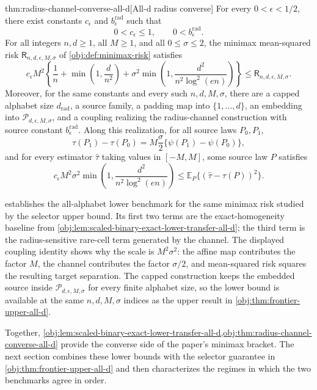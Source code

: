 \begin{theoremv}{thm:radius-channel-converse-all-d}[All-d radius converse]
For every \(0<\epsilon<1/2\), there exist constants \(c_{\epsilon}\) and \(b_{\epsilon}^{\mathrm{rad}}\) such that
\[
0<c_{\epsilon}\le 1,
\qquad
0<b_{\epsilon}^{\mathrm{rad}}.
\]
For all integers \(n,d\ge 1\), all \(M\ge 1\), and all \(0\le \sigma\le 2\), the minimax mean-squared risk \(\mathsf R_{n,d,\epsilon,M,\sigma}\) of \cref{obj:def:minimax-risk} satisfies
\[
c_{\epsilon}M^2
\left\{
\frac1n+\min\left(1,\frac d{n^2}\right)
+\sigma^2\min\left(1,\frac{d^2}{n^2\log^2(en)}\right)
\right\}
\le
\mathsf R_{n,d,\epsilon,M,\sigma}.
\]
Moreover, for the same constants and every such \(n,d,M,\sigma\), there are a capped alphabet size \(d_{\mathrm{rad}}\), a source family, a padding map into \(\{1,\ldots,d\}\), an embedding into \(\mathcal P_{d,\epsilon,M,\sigma}\), and a coupling realizing the radius-channel construction with source constant \(b_{\epsilon}^{\mathrm{rad}}\). Along this realization, for all source laws \(P_0,P_1\),
\[
\tau(P_1)-\tau(P_0)
=
M\frac{\sigma}{2}
\{\psi(P_1)-\psi(P_0)\},
\]
and for every estimator \(\widehat\tau\) taking values in \([-M,M]\), some source law \(P\) satisfies
\[
c_{\epsilon}M^2\sigma^2
\min\left(1,\frac{d^2}{n^2\log^2(en)}\right)
\le
\mathbb E_P\{(\widehat\tau-\tau(P))^2\}.
\]
\end{theoremv}

 establishes the all-alphabet lower benchmark for the same minimax risk studied by the selector upper bound. Its first two terms are the exact-homogeneity baseline from \cref{obj:lem:scaled-binary-exact-lower-transfer-all-d}; the third term is the radius-sensitive rare-cell term generated by the channel. The displayed coupling identity shows why the scale is \(M^2\sigma^2\): the affine map contributes the factor \(M\), the channel contributes the factor \(\sigma/2\), and mean-squared risk squares the resulting target separation. The capped construction keeps the embedded source inside \(\mathcal P_{d,\epsilon,M,\sigma}\) for every finite alphabet size, so the lower bound is available at the same \(n,d,M,\sigma\) indices as the upper result in \cref{obj:thm:frontier-upper-all-d}.

Together, \cref{obj:lem:scaled-binary-exact-lower-transfer-all-d,obj:thm:radius-channel-converse-all-d} provide the converse side of the paper's minimax bracket. The next section combines these lower bounds with the selector guarantee in \cref{obj:thm:frontier-upper-all-d} and then characterizes the regimes in which the two benchmarks agree in order.
